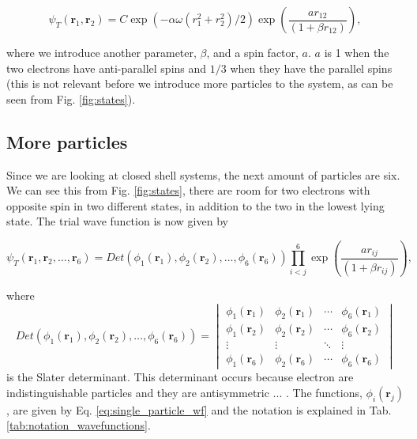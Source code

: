 \begin{equation}
   \psi_{T}(\bm{r}_1,\bm{r}_2) = 
   C\exp{\left(-\alpha\omega(r_1^2+r_2^2)/2\right)}
   \exp{\left(\frac{ar_{12}}{(1+\beta r_{12})}\right)}, 
\label{eq:trial_interacting}
\end{equation}

where we introduce another parameter, $\beta$, and a spin factor, $a$. $a$ is 1 when the two electrons have anti-parallel spins and $1/3$ when they have the parallel spins (this is not relevant before we introduce more particles to the system, as can be seen from Fig. \ref{fig:states}).

\subsection{More particles}

Since we are looking at closed shell systems, the next amount of particles are six. We can see this from Fig. \ref{fig:states}, there are room for two electrons with opposite spin in two different states, in addition to the two in the lowest lying state. The trial wave function is now given by

\begin{equation}
   \psi_{T}(\bm{r}_1,\bm{r}_2,\dots, \bm{r}_6) = 
   Det\left(\phi_{1}(\bm{r}_1),\phi_{2}(\bm{r}_2),
   \dots,\phi_{6}(\bm{r}_6)\right)
   \prod_{i<j}^{6}\exp{\left(\frac{a r_{ij}}{(1+\beta r_{ij})}\right)},
\end{equation}

where 
$$ Det\left(\phi_{1}(\bm{r}_1),\phi_{2}(\bm{r}_2),
   \dots,\phi_{6}(\bm{r}_6)\right) =  \begin{vmatrix}
  \phi_{1}(\bm{r}_1) & \phi_{2}(\bm{r}_1) & \cdots & \phi_{6}(\bm{r}_1) \\
  \phi_{1}(\bm{r}_2) & \phi_{2}(\bm{r}_2) & \cdots & \phi_{6}(\bm{r}_2) \\
  \vdots  & \vdots  & \ddots & \vdots  \\
  \phi_{1}(\bm{r}_6) & \phi_{2}(\bm{r}_6) & \cdots & \phi_{6}(\bm{r}_6) 
\end{vmatrix}$$
is the Slater determinant. This determinant occurs because electron are indistinguishable particles and they are antisymmetric ... . The functions, $\phi_{i}(\bm{r}_j)$,  are given by Eq. \ref{eq:single_particle_wf} and the notation is explained in Tab. \ref{tab:notation_wavefunctions}. 

